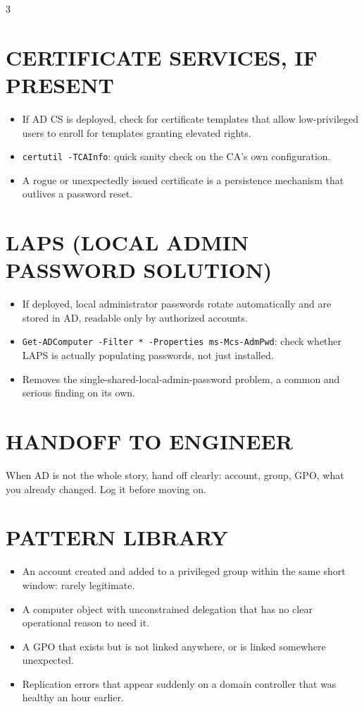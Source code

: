 \documentclass[7pt,landscape]{article}
\begin{document}
\begin{multicols*}{3}
\section{CERTIFICATE SERVICES, IF PRESENT}
\begin{itemize}
    \item If AD CS is deployed, check for certificate templates that allow low-privileged users to enroll for templates granting elevated rights.
    \item \texttt{certutil -TCAInfo}: quick sanity check on the CA's own configuration.
    \item A rogue or unexpectedly issued certificate is a persistence mechanism that outlives a password reset.
\end{itemize}

\section{LAPS (LOCAL ADMIN PASSWORD SOLUTION)}
\begin{itemize}
    \item If deployed, local administrator passwords rotate automatically and are stored in AD, readable only by authorized accounts.
    \item \texttt{Get-ADComputer -Filter * -Properties ms-Mcs-AdmPwd}: check whether LAPS is actually populating passwords, not just installed.
    \item Removes the single-shared-local-admin-password problem, a common and serious finding on its own.
\end{itemize}

\section{HANDOFF TO ENGINEER}
When AD is not the whole story, hand off clearly: account, group, GPO, what you already changed. Log it before moving on.

\section{PATTERN LIBRARY}
\begin{itemize}
    \item An account created and added to a privileged group within the same short window: rarely legitimate.
    \item A computer object with unconstrained delegation that has no clear operational reason to need it.
    \item A GPO that exists but is not linked anywhere, or is linked somewhere unexpected.
    \item Replication errors that appear suddenly on a domain controller that was healthy an hour earlier.
\end{itemize}

\end{multicols*}
\end{document}
